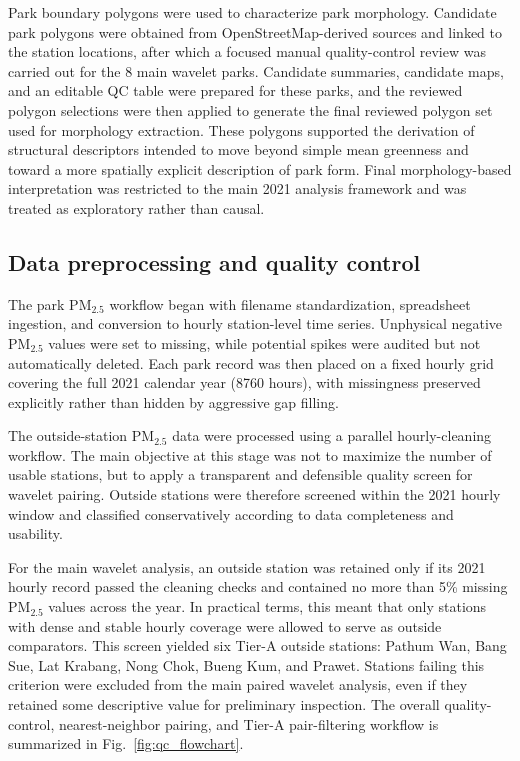 Park boundary polygons were used to characterize park morphology. Candidate park polygons were obtained from OpenStreetMap-derived sources and linked to the station locations, after which a focused manual quality-control review was carried out for the 8 main wavelet parks. Candidate summaries, candidate maps, and an editable QC table were prepared for these parks, and the reviewed polygon selections were then applied to generate the final reviewed polygon set used for morphology extraction. These polygons supported the derivation of structural descriptors intended to move beyond simple mean greenness and toward a more spatially explicit description of park form. Final morphology-based interpretation was restricted to the main 2021 analysis framework and was treated as exploratory rather than causal.

\subsection{Data preprocessing and quality control}

The park PM$_{2.5}$ workflow began with filename standardization, spreadsheet ingestion, and conversion to hourly station-level time series. Unphysical negative PM$_{2.5}$ values were set to missing, while potential spikes were audited but not automatically deleted. Each park record was then placed on a fixed hourly grid covering the full 2021 calendar year (8760 hours), with missingness preserved explicitly rather than hidden by aggressive gap filling.

The outside-station PM$_{2.5}$ data were processed using a parallel hourly-cleaning workflow. The main objective at this stage was not to maximize the number of usable stations, but to apply a transparent and defensible quality screen for wavelet pairing. Outside stations were therefore screened within the 2021 hourly window and classified conservatively according to data completeness and usability.

For the main wavelet analysis, an outside station was retained only if its 2021 hourly record passed the cleaning checks and contained no more than 5\% missing PM$_{2.5}$ values across the year. In practical terms, this meant that only stations with dense and stable hourly coverage were allowed to serve as outside comparators. This screen yielded six Tier-A outside stations: Pathum Wan, Bang Sue, Lat Krabang, Nong Chok, Bueng Kum, and Prawet. Stations failing this criterion were excluded from the main paired wavelet analysis, even if they retained some descriptive value for preliminary inspection. The overall quality-control, nearest-neighbor pairing, and Tier-A pair-filtering workflow is summarized in Fig.~\ref{fig:qc_flowchart}.

